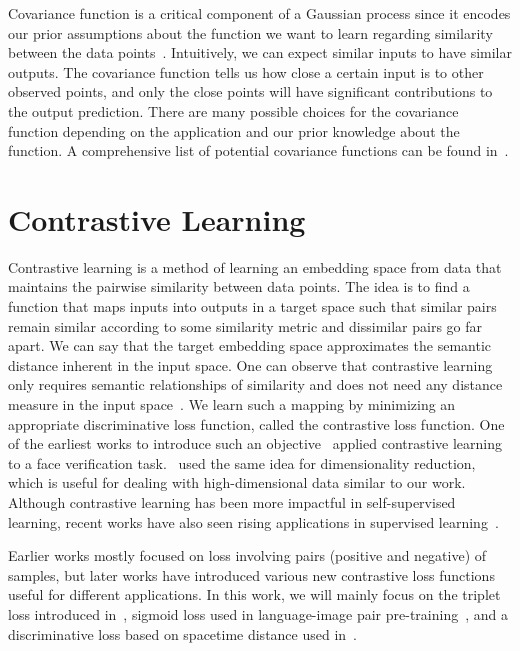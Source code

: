 Covariance function is a critical component of a Gaussian process since it encodes our prior assumptions about the function we want to learn regarding similarity between the data points~\cite{GPML}. Intuitively, we can expect similar inputs to have similar outputs. The covariance function tells us how close a certain input is to other observed points, and only the close points will have significant contributions to the output prediction. There are many possible choices for the covariance function depending on the application and our prior knowledge about the function. A comprehensive list of potential covariance functions can be found in~\cite{GPML}.


\section{Contrastive Learning}\label{Contrast}
Contrastive learning is a method of learning an embedding space from data that maintains the pairwise similarity between data points. The idea is to find a function that maps inputs into outputs in a target space such that similar pairs remain similar according to some similarity metric and dissimilar pairs go far apart. We can say that the target embedding space approximates the semantic distance inherent in the input space. One can observe that contrastive learning only requires semantic relationships of similarity and does not need any distance measure in the input space~\cite{PairMarginCL}. We learn such a mapping by minimizing an appropriate discriminative loss function, called the contrastive loss function. One of the earliest works to introduce such an objective~\cite{ContLoss} applied contrastive learning to a face verification task.~\cite{PairMarginCL} used the same idea for dimensionality reduction, which is useful for dealing with high-dimensional data similar to our work. Although contrastive learning has been more impactful in self-supervised learning, recent works have also seen rising applications in supervised learning~\cite{SelfSupervisedCont, SupervisedCont}.

Earlier works mostly focused on loss involving pairs (positive and negative) of samples, but later works have introduced various new contrastive loss functions useful for different applications. In this work, we will mainly focus on the triplet loss introduced in~\cite{TripletLoss}, sigmoid loss used in language-image pair pre-training~\cite{SigLIP}, and a discriminative loss based on spacetime distance used in~\cite{SpaceMesh}.

